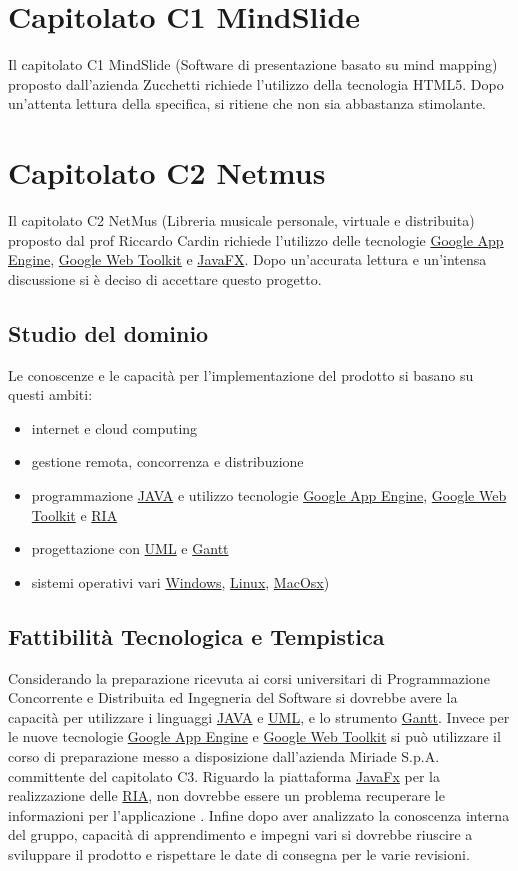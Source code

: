 


\chapter{Capitolato C1 MindSlide}
Il capitolato C1 MindSlide (Software di presentazione basato su mind mapping)
proposto dall'azienda Zucchetti richiede l'utilizzo della tecnologia HTML5. Dopo
un'attenta lettura della specifica, si ritiene che non sia abbastanza stimolante.

\chapter{Capitolato C2 Netmus}
Il capitolato C2 NetMus (Libreria musicale personale, virtuale e distribuita)
proposto dal prof Riccardo Cardin richiede l'utilizzo delle tecnologie \underline{Google
App Engine}, \underline{Google Web Toolkit} e \underline{JavaFX}. Dopo
un'accurata lettura e un'intensa discussione si \`e deciso di accettare questo progetto.
\section{Studio del dominio} 
Le conoscenze e le capacit\`a per l'implementazione del prodotto si basano su
questi ambiti:
\begin{itemize}
  \item internet e cloud computing
  \item gestione remota, concorrenza e distribuzione
  \item programmazione \underline{JAVA} e utilizzo tecnologie \underline{Google App
  Engine}, \underline{Google Web Toolkit} e \underline{RIA}
  \item progettazione con \underline{UML} e \underline{Gantt}
  \item sistemi operativi vari \underline{Windows}, \underline{Linux},
  \underline{MacOsx})
\end{itemize}

\section{Fattibilit\`a Tecnologica e Tempistica}
Considerando la preparazione ricevuta ai corsi universitari di Programmazione
Concorrente e Distribuita ed Ingegneria del Software si dovrebbe avere la
capacit\`a per utilizzare i linguaggi \underline{JAVA} e \underline{UML}, e lo
strumento \underline{Gantt}. Invece per le nuove tecnologie \underline{Google
App Engine} e \underline{Google Web Toolkit} si pu\`o utilizzare il corso di
preparazione messo a disposizione dall'azienda Miriade S.p.A. committente del
capitolato C3. Riguardo la piattaforma \underline{JavaFx} per la realizzazione
delle \underline{RIA}, non dovrebbe essere un problema recuperare le
informazioni per l'applicazione . Infine dopo aver analizzato la conoscenza interna del gruppo, capacit\`a di apprendimento e impegni vari si dovrebbe riuscire a sviluppare il prodotto e rispettare le date di consegna per le varie revisioni.
